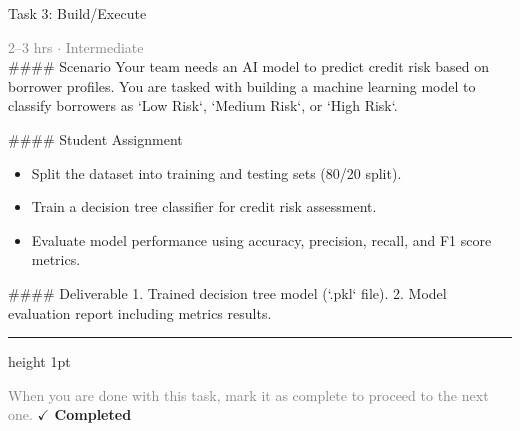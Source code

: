 \documentclass[10pt,a4paper]{article}
\begin{document}
\begin{taskbox}{Task 3: Build/Execute}

    {\small \textcolor{gray}{2--3 hrs $\cdot$ Intermediate}}\\[12pt]

    \#\#\#\# Scenario  
Your team needs an AI model to predict credit risk based on borrower profiles. You are tasked with building a machine learning model to classify borrowers as `Low Risk`, `Medium Risk`, or `High Risk`.  

\#\#\#\# Student Assignment  
\begin{itemize}
    \item Split the dataset into training and testing sets (80/20 split).  
    \item Train a decision tree classifier for credit risk assessment.  
    \item Evaluate model performance using accuracy, precision, recall, and F1 score metrics.  
\end{itemize}

\#\#\#\# Deliverable  
1. Trained decision tree model (`.pkl` file).  
2. Model evaluation report including metrics results.\par

    \vspace{16pt}

    \textcolor{cardBorder}{\hrule height 1pt}\vspace{8pt}

    \small \textcolor{gray}{When you are done with this task, mark it as complete to proceed to the next one.} \hfill \textbf{\textcolor{brandDark}{$\checkmark$ Completed}}

\end{taskbox}
\end{document}
